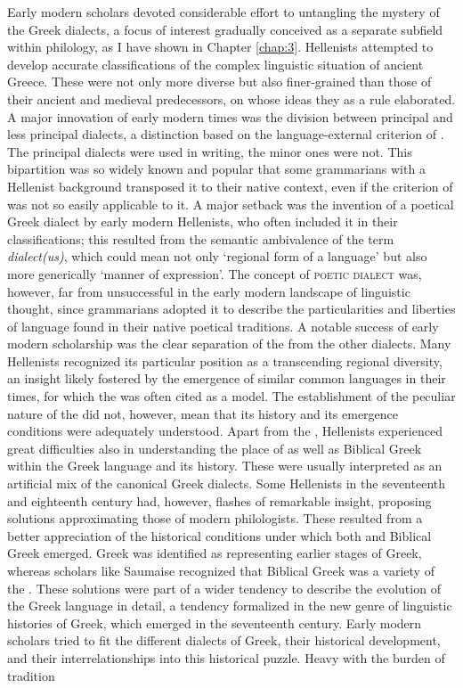 Early modern scholars devoted considerable effort to untangling the mystery of the Greek dialects, a focus of interest gradually conceived as a separate subfield within philology, as I have shown in Chapter \ref{chap:3}. Hellenists attempted to develop accurate classifications of the complex linguistic situation of ancient Greece. These were not only more diverse but also finer-grained than those of their ancient and medieval predecessors, on whose ideas they as a rule elaborated. A major innovation of early modern times was the division between principal and less principal dialects, a distinction based on the language-external criterion of . The principal dialects were used in writing, the minor ones were not. This bipartition was so widely known and popular that some  grammarians with a Hellenist background transposed it to their native context, even if the criterion of  was not so easily applicable to it. A major setback was the invention of a poetical Greek dialect by early modern Hellenists, who often included it in their classifications; this resulted from the semantic ambivalence of the term \textit{dialect(us)}, which could mean not only ‘regional form of a language’ but also more generically ‘manner of expression’. The concept of \textsc{poetic} \textsc{dialect} was, however, far from unsuccessful in the early modern landscape of linguistic thought, since  grammarians adopted it to describe the particularities and liberties of language found in their native poetical traditions. A notable success of early modern scholarship was the clear separation of the  from the other dialects. Many Hellenists recognized its particular position as a  transcending regional diversity, an insight likely fostered by the emergence of similar common languages in their times, for which the  was often cited as a model. The establishment of the peculiar nature of the  did not, however, mean that its history and its emergence conditions were adequately understood. Apart from the , Hellenists experienced great difficulties also in understanding the place of  as well as Biblical Greek within the Greek language and its history. These were usually interpreted as an artificial mix of the canonical Greek dialects. Some Hellenists in the seventeenth and eighteenth century had, however, flashes of remarkable insight, proposing solutions approximating those of modern philologists. These resulted from a better appreciation of the historical conditions under which both  and Biblical Greek emerged.  Greek was identified as representing earlier stages of Greek, whereas scholars like Saumaise recognized that Biblical Greek was a  variety of the . These solutions were part of a wider tendency to describe the evolution of the Greek language in detail, a tendency formalized in the new genre of linguistic histories of Greek, which emerged in the seventeenth century. Early modern scholars tried to fit the different dialects of Greek, their historical development, and their interrelationships into this historical puzzle. Heavy with the burden of tradition 